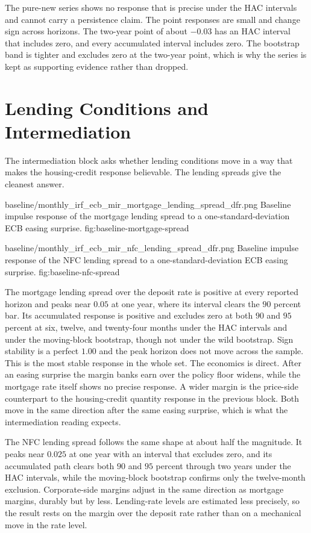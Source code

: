The pure-new series shows no response that is precise under the HAC intervals and cannot carry a persistence claim. The point responses are small and change sign across horizons. The two-year point of about \(-0.03\) has an HAC interval that includes zero, and every accumulated interval includes zero. The bootstrap band is tighter and excludes zero at the two-year point, which is why the series is kept as supporting evidence rather than dropped.

\section{Lending Conditions and Intermediation}

The intermediation block asks whether lending conditions move in a way that makes the housing-credit response believable. The lending spreads give the cleanest answer.

\thesisfigure
  {baseline/monthly_irf_ecb_mir_mortgage_lending_spread_dfr.png}
  {Baseline impulse response of the mortgage lending spread to a one-standard-deviation ECB easing surprise.}
  {fig:baseline-mortgage-spread}

\thesisfigure
  {baseline/monthly_irf_ecb_mir_nfc_lending_spread_dfr.png}
  {Baseline impulse response of the NFC lending spread to a one-standard-deviation ECB easing surprise.}
  {fig:baseline-nfc-spread}

The mortgage lending spread over the deposit rate is positive at every reported horizon and peaks near \(0.05\) at one year, where its interval clears the \(90\) percent bar. Its accumulated response is positive and excludes zero at both \(90\) and \(95\) percent at six, twelve, and twenty-four months under the HAC intervals and under the moving-block bootstrap, though not under the wild bootstrap. Sign stability is a perfect \(1.00\) and the peak horizon does not move across the sample. This is the most stable response in the whole set. The economics is direct. After an easing surprise the margin banks earn over the policy floor widens, while the mortgage rate itself shows no precise response. A wider margin is the price-side counterpart to the housing-credit quantity response in the previous block. Both move in the same direction after the same easing surprise, which is what the intermediation reading expects.

The NFC lending spread follows the same shape at about half the magnitude. It peaks near \(0.025\) at one year with an interval that excludes zero, and its accumulated path clears both \(90\) and \(95\) percent through two years under the HAC intervals, while the moving-block bootstrap confirms only the twelve-month exclusion. Corporate-side margins adjust in the same direction as mortgage margins, durably but by less. Lending-rate levels are estimated less precisely, so the result rests on the margin over the deposit rate rather than on a mechanical move in the rate level.

